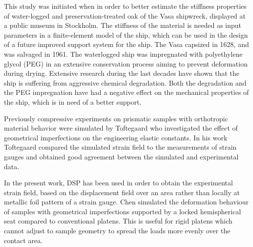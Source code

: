 \documentclass[review]{elsarticle}
\begin{document}
This study was initiated when in order to better estimate the stiffness properties of water-logged and preservation-treated  oak of the Vasa shipwreck, displayed at a public museum in Stockholm. The stiffness of the material is needed as input parameters in a finite-element model of the ship, which can be used in the design of a future improved support system for the ship. The Vasa capsized in 1628, and was salvaged in 1961. 
The waterlogged ship was impregnated with polyethylene glycol (PEG) in an extensive conservation process aiming to prevent deformation during drying. 
Extensive research during the last decades have shown that the ship is suffering
from aggressive chemical degradation. Both the degradation \cite{bjurhager2012state}
and the PEG impregnation \cite{ljungdahl2007transverse} have had a negative effect on the mechanical properties of the ship, which is in need of a better support. \par
Previously compressive experiments on prismatic samples with orthotropic
material behavior were simulated by Toftegaard \cite{Toftegaard1999849} who investigated the effect of geometrical imperfections on the
engineering elastic constants.
In his work Toftegaard compared the simulated strain field to the measurements
of strain gauges and obtained good agreement between the simulated and experimental
data.\par
In the present work, DSP has been used in order to obtain the experimental
strain field, based on the displacement field over an area rather than locally
at metallic foil pattern of a strain gauge.
Chen \cite{Chen001} simulated the deformation behaviour of samples with geometrical
imperfections supported by a locked hemispherical seat compared to conventional platens. This is useful for rigid platens which cannot adjust to sample geometry to spread the loads more evenly over the contact area.
\par 

\end{document}
